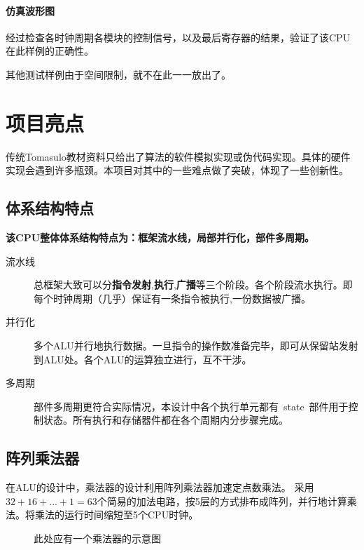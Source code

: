 \documentclass[twoside]{article}
\begin{document}
\paragraph{仿真波形图}
经过检查各时钟周期各模块的控制信号，以及最后寄存器的结果，验证了该CPU在此样例的正确性。

其他测试样例由于空间限制，就不在此一一放出了。


\section{项目亮点}
传统Tomasulo教材资料只给出了算法的软件模拟实现或伪代码实现。具体的硬件实现会遇到许多瓶颈。本项目对其中的一些难点做了突破，体现了一些创新性。
\subsection{体系结构特点}
\textbf{该CPU整体体系结构特点为：框架流水线，局部并行化，部件多周期。}  
\begin{description}
	\item[流水线] 总框架大致可以分\textbf{指令发射},\textbf{执行},\textbf{广播}等三个阶段。各个阶段流水执行。即每个时钟周期（几乎）保证有一条指令被执行,一份数据被广播。
	\item[并行化] 多个ALU并行地执行数据。一旦指令的操作数准备完毕，即可从保留站发射到ALU处。各个ALU的运算独立进行，互不干涉。
	\item[多周期] 部件多周期更符合实际情况，本设计中各个执行单元都有~state~部件用于控制状态。所有执行和存储器件都在各个周期内分步骤完成。
\end{description}

\subsection{阵列乘法器}
在ALU的设计中，乘法器的设计利用阵列乘法器加速定点数乘法。  
采用$32 + 16 +... +1=63$个简易的加法电路，按5层的方式排布成阵列，并行地计算乘法。将乘法的运行时间缩短至5个CPU时钟。

\begin{figure}[!hbp]
\makebox[\textwidth]{\framebox[5cm]{\rule{0pt}{5cm}}}
\caption{此处应有一个乘法器的示意图}
\label{fig:temp1}
\end{figure}
\end{document}
